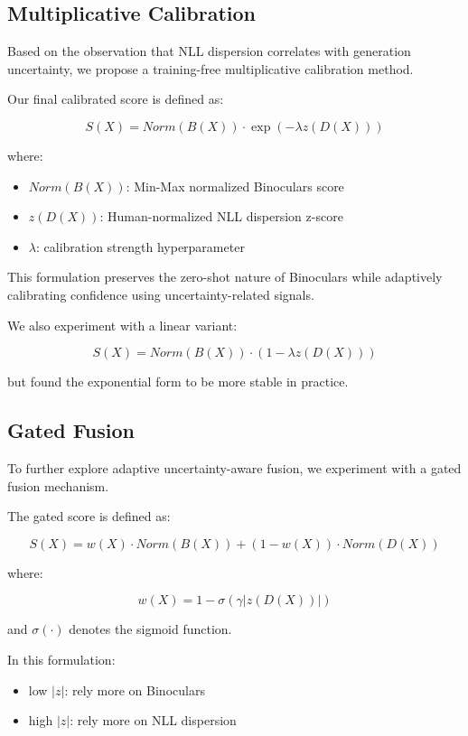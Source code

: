 \documentclass{article}
\begin{document}
\subsection{Multiplicative Calibration}

Based on the observation that NLL dispersion correlates with generation uncertainty, we propose a training-free multiplicative calibration method.

Our final calibrated score is defined as:

\[
S(X)=Norm(B(X))\cdot \exp(-\lambda z(D(X)))
\]

where:

\begin{itemize}
    \item \(Norm(B(X))\): Min-Max normalized Binoculars score
    \item \(z(D(X))\): Human-normalized NLL dispersion z-score
    \item \(\lambda\): calibration strength hyperparameter
\end{itemize}

This formulation preserves the zero-shot nature of Binoculars while adaptively calibrating confidence using uncertainty-related signals.

We also experiment with a linear variant:

\[
S(X)=Norm(B(X))\cdot (1-\lambda z(D(X)))
\]

but found the exponential form to be more stable in practice.

\subsection{Gated Fusion}

To further explore adaptive uncertainty-aware fusion, we experiment with a gated fusion mechanism.

The gated score is defined as:

\[
S(X)=w(X)\cdot Norm(B(X))
+(1-w(X))\cdot Norm(D(X))
\]

where:

\[
w(X)=1-\sigma(\gamma |z(D(X))|)
\]

and \(\sigma(\cdot)\) denotes the sigmoid function.

In this formulation:

\begin{itemize}
    \item low \(|z|\): rely more on Binoculars
    \item high \(|z|\): rely more on NLL dispersion
\end{itemize}
\end{document}
